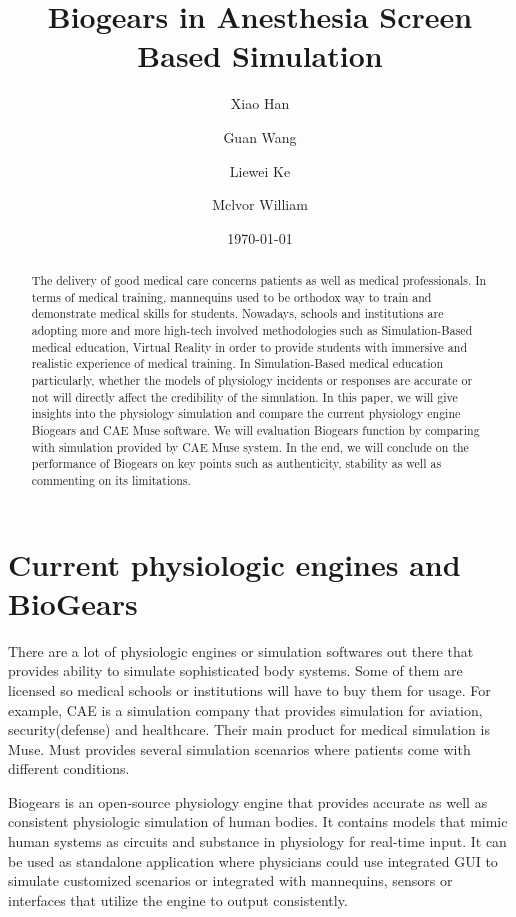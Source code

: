 \documentclass[a4paper]{article}
\title{Biogears in Anesthesia Screen Based Simulation}
\author{
  Xiao Han\\
  \and Guan Wang\\
  \and Liewei Ke\\
  \and Mclvor William
}
\date{\today}
\begin{document}
\maketitle

\begin{abstract}
The delivery of good medical care concerns patients as well as medical professionals. In terms of medical training, mannequins used to be orthodox way to train and demonstrate medical skills for students. Nowadays, schools and institutions are adopting more and more high-tech involved methodologies such as Simulation-Based medical education, Virtual Reality in order to provide students with immersive and realistic experience of medical training. In Simulation-Based medical education particularly, whether the models of physiology incidents or responses are accurate or not will directly affect the credibility of the simulation. In this paper, we will give insights into the physiology simulation and compare the current physiology engine Biogears and CAE Muse software. We will evaluation Biogears function by comparing with simulation provided by CAE Muse system. In the end, we will conclude on the performance of Biogears on key points such as authenticity, stability as well as commenting on its limitations.
\end{abstract}

\section{Current physiologic engines and BioGears}
There are a lot of physiologic engines or simulation softwares out there that provides ability to simulate sophisticated body systems. Some of them are licensed so medical schools or institutions will have to buy them for usage. For example, CAE is a simulation company that provides simulation for aviation, security(defense) and healthcare. Their main product for medical simulation is Muse. Must provides several simulation scenarios where patients come with different conditions.

Biogears is an open-source physiology engine that provides accurate as well as consistent physiologic simulation of human bodies. It contains models that mimic human systems as circuits and substance in physiology for real-time input. It can be used as standalone application where physicians could use integrated GUI to simulate customized scenarios or integrated with mannequins, sensors or interfaces that utilize the engine to output consistently.
\end{document}
